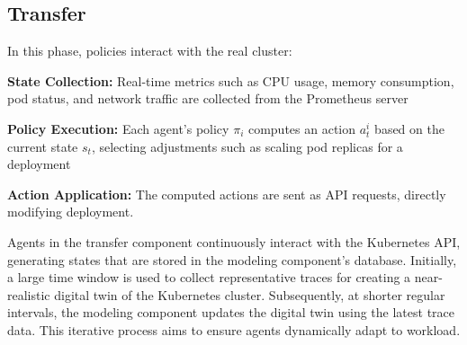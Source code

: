 \documentclass[conference]{IEEEtran}
\begin{document}



\subsection{Transfer}
\label{sec:transfer}


In this phase, policies interact with the real cluster:
\begin{enumerate*}[label=\textbf{\arabic*)}, itemjoin={;\quad }]
    \item \textbf{State Collection:} Real-time metrics such as CPU usage, memory consumption, pod status, and network traffic are collected from the Prometheus server~\cite{prometheus}
    \item \textbf{Policy Execution:} Each agent's policy $\pi_i$ computes an action $a_t^i$ based on the current state $s_t$, selecting adjustments such as scaling pod replicas for a deployment
    \item \textbf{Action Application:} The computed actions are sent as API requests, directly modifying deployment.
\end{enumerate*}

Agents in the transfer component continuously interact with the Kubernetes API, generating states that are stored in the modeling component's database. Initially, a large time window is used to collect representative traces for creating a near-realistic digital twin of the Kubernetes cluster. Subsequently, at shorter regular intervals, the modeling component updates the digital twin using the latest trace data. This iterative process aims to ensure agents dynamically adapt to workload.
\end{document}

